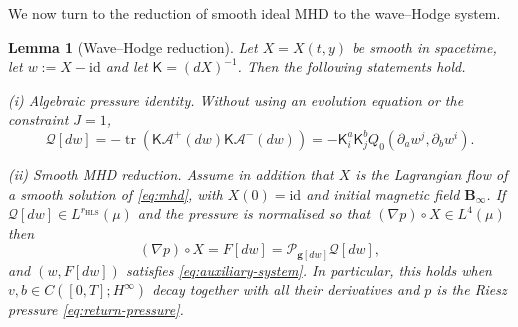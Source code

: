 \documentclass[11pt,reqno]{amsart}
\theoremstyle{plain}
\newtheorem{lemma}[theorem]{Lemma}
\theoremstyle{definition}
\theoremstyle{remark}
\numberwithin{equation}{section}
\DeclareMathOperator{\tr}{tr}
\newcommand{\Kmat}{\mathsf K}
\newcommand{\gmetric}{\mathbf g}
\newcommand{\Binf}{\mathbf B_\infty}
\begin{document}
We now turn to the reduction of smooth ideal MHD to the wave--Hodge system.

\begin{lemma}[Wave--Hodge reduction]
\label{lem:wave-hodge-reduction}
Let $X=X(t,y)$ be smooth in spacetime, let $w:=X-\mathrm{id}$ and let
$\Kmat=(dX)^{-1}$.  Then the following statements hold.
 
\emph{(i) Algebraic pressure identity.}
Without using an evolution equation or the constraint $J=1$,
\begin{equation}\label{eq:datum-geometric}
 \mathcal Q[dw]
 =-\tr \left(
   \Kmat\mathcal A^+(dw)\Kmat\mathcal A^-(dw)\right)
 =-\Kmat^a_i\Kmat^b_j
   Q_0(\partial_aw^j,\partial_bw^i).
\end{equation}
 
\emph{(ii) Smooth MHD reduction.}
Assume in addition that $X$ is the Lagrangian flow of a smooth solution of
\eqref{eq:mhd}, with $X(0)=\mathrm{id}$ and initial magnetic field $\Binf$.
If
$\mathcal Q[dw]\in L^{r_{\mathrm{HLS}}}(\mu)$ and the pressure is normalised so
that $(\nabla p)\circ X\in L^4(\mu)$ then
\[
 (\nabla p)\circ X=F[dw]=\mathcal{P}_{\gmetric[dw]}\mathcal Q[dw],
\]
and $(w,F[dw])$ satisfies \eqref{eq:auxiliary-system}. In particular, this holds when
$v,b\in C([0,T];H^\infty)$ decay together with all their derivatives and $p$ is
the Riesz pressure \eqref{eq:return-pressure}.
\end{lemma}
 
\end{document}
